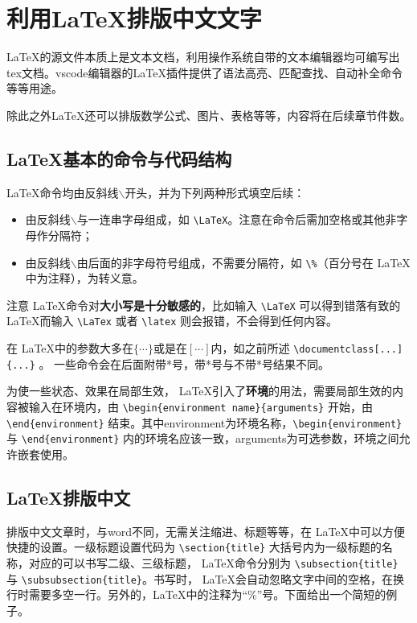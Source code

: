 \section{利用\LaTeX 排版中文文字}
\LaTeX 的源文件本质上是文本文档，利用操作系统自带的文本编辑器均可编写出tex文档。vscode编辑器的LaTeX插件提供了语法高亮、匹配查找、自动补全命令等等用途。

除此之外\LaTeX 还可以排版数学公式、图片、表格等等，内容将在后续章节件数。
\subsection{\LaTeX 基本的命令与代码结构}
\LaTeX 命令均由反斜线$\backslash$开头，并为下列两种形式填空后续：
\begin{itemize}
\item 由反斜线$\backslash$与一连串字母组成，如 \verb|\LaTeX|。注意在命令后需加空格或其他非字母作分隔符；
\item 由反斜线$\backslash$由后面的非字母符号组成，不需要分隔符，如 \verb|\%|（百分号在 \LaTeX  中为注释），为转义意。
\end{itemize}

注意 \LaTeX 命令对\textbf{大小写是十分敏感的}，比如输入 \verb|\LaTeX| 可以得到错落有致的 \LaTeX 而输入 \verb|\LaTex| 或者 \verb|\latex| 则会报错，不会得到任何内容。

在 \LaTeX 中的参数大多在$\{\cdots\}$或是在$[\cdots]$内，如之前所述 \verb|\documentclass[...]{...}| 。
一些命令会在后面附带*号，带*号与不带*号结果不同。

为使一些状态、效果在局部生效， \LaTeX  引入了\textbf{环境}的用法，需要局部生效的内容被输入在环境内，由 \verb|\begin{environment name}{arguments}| 开始，由 \verb|\end{environment}| 结束。其中environment为环境名称，\verb|\begin{environment} |与 \verb|\end{environment}| 内的环境名应该一致，arguments为可选参数，环境之间允许嵌套使用。
\subsection{\LaTeX 排版中文}
排版中文文章时，与word不同，无需关注缩进、标题等等，在 \LaTeX  中可以方便快捷的设置。一级标题设置代码为 \verb|\section{title}| 大括号内为一级标题的名称，对应的可以书写二级、三级标题， \LaTeX  命令分别为 \verb|\subsection{title}| 与 \verb|\subsubsection{title}|。书写时， \LaTeX  会自动忽略文字中间的空格，在换行时需要多空一行。另外的，\LaTeX  中的注释为“\%”号。下面给出一个简短的例子。

